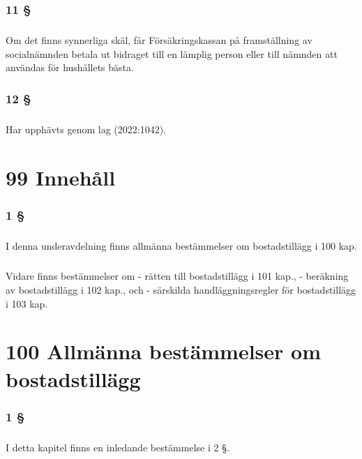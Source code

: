 \documentclass[a4paper,notitlepage,openany,10pt]{book}
\begin{document}
\subsection*{11 §}
\paragraph*{}
Om det finns synnerliga skäl, får Försäkringskassan på framställning av socialnämnden betala ut bidraget till en lämplig person eller till nämnden att användas för hushållets bästa.
\subsection*{12 §}
\paragraph*{}
Har upphävts genom
lag (2022:1042).
\chapter*{99 Innehåll}
\subsection*{1 §}
\paragraph*{}
I denna underavdelning finns allmänna bestämmelser om bostadstillägg i 100 kap.
\paragraph*{}
Vidare finns bestämmelser om
\newline - rätten till bostadstillägg i 101 kap.,
\newline - beräkning av bostadstillägg i 102 kap., och
\newline - särskilda handläggningsregler för bostadstillägg i 103 kap.
\chapter*{100 Allmänna bestämmelser om bostadstillägg}
\subsection*{1 §}
\paragraph*{}
I detta kapitel finns en inledande bestämmelse i 2 §.
\end{document}
